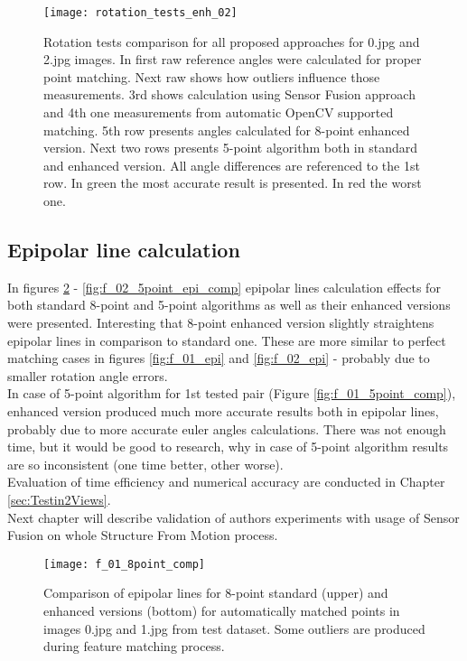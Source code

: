 \begin{figure}[h!]
    \centering
    \texttt{[image: rotation\_tests\_enh\_02]}
    \caption[Rotation tests comparison for all proposed approaches - 2nd example]{Rotation tests comparison for all proposed approaches for 0.jpg and 2.jpg images. In first raw reference angles were calculated for proper point matching. Next raw shows how outliers influence those measurements. 3rd shows calculation using Sensor Fusion approach and 4th one measurements from automatic OpenCV supported matching. 5th row presents angles calculated for 8-point enhanced version. Next two rows presents 5-point algorithm both in standard and enhanced version. All angle differences are referenced to the 1st row. In green the most accurate result is presented. In red the worst one.}
    \label{fig:rotation_tests_enh_02}
\end{figure}
\clearpage
\subsection{Epipolar line calculation}
In figures \ref{fig:f_01_8point_epi_comp} - \ref{fig:f_02_5point_epi_comp} epipolar lines calculation effects for both standard 8-point and 5-point algorithms as well as their enhanced versions were presented. Interesting that 8-point enhanced version slightly straightens epipolar lines in comparison to standard one. These are more similar to perfect matching cases in figures \ref{fig:f_01_epi} and \ref{fig:f_02_epi} - probably due to smaller rotation angle errors. \\
In case of 5-point algorithm for 1st tested pair (Figure \ref{fig:f_01_5point_comp}), enhanced version produced much more accurate results both in epipolar lines, probably due to more accurate euler angles calculations. There was not enough time, but it would be good to research, why in case of 5-point algorithm results are so inconsistent (one time better, other worse). \\
Evaluation of time efficiency and numerical accuracy are conducted in Chapter \ref{sec:Testin2Views}. \\
Next chapter will describe validation of authors experiments with usage of Sensor Fusion on whole Structure From Motion process.
\begin{figure}[h!]
    \centering
    \texttt{[image: f\_01\_8point\_comp]}
    \caption[Comparison of epipolar lines for 8-point standard and enhanced versions  - 1st example]{Comparison of epipolar lines for 8-point standard (upper) and enhanced versions (bottom) for automatically matched points in images 0.jpg and 1.jpg from test dataset. Some outliers are produced during feature matching process.}
    \label{fig:f_01_8point_epi_comp}
\end{figure}

